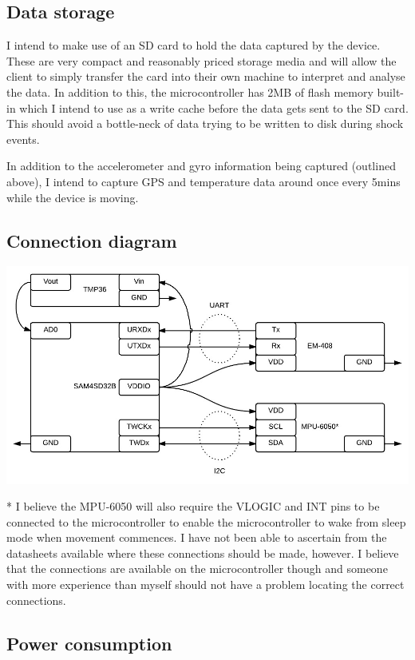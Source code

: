 \documentclass[a4paper, twoside]{article}
\begin{document}
\subsection{Data storage}
I intend to make use of an SD card to hold the data captured by the device.
These are very compact and reasonably priced storage media and will allow the
client to simply transfer the card into their own machine to interpret and
analyse the data. In addition to this, the microcontroller has 2MB of flash
memory built-in which I intend to use as a write cache before the data gets sent
to the SD card. This should avoid a bottle-neck of data trying to be written to
disk during shock events.

In addition to the accelerometer and gyro information being captured (outlined
above), I intend to capture GPS and temperature data around once every 5mins while the device is
moving.

\clearpage
\subsection{Connection diagram}
\begin{center}
\includegraphics[scale=0.45]{images/connectiondiagram.jpeg}
\end{center}
* I believe the MPU-6050 will also require the VLOGIC and INT pins to be
connected to the microcontroller to enable the microcontroller to wake from
sleep mode when movement commences. I have not been able to ascertain from the
datasheets available where these connections should be made, however. I believe
that the connections are available on the microcontroller though and someone
with more experience than myself should not have a problem locating the correct
connections.

\subsection{Power consumption}
\end{document}
